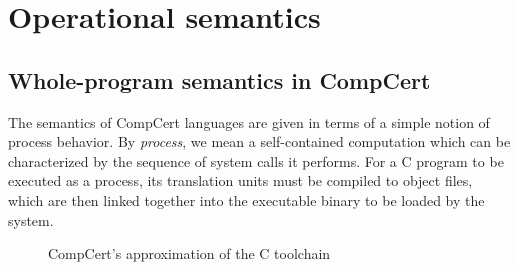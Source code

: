 \documentclass[acmsmall,authordraft]{acmart}
\begin{document}


\section{Operational semantics} \label{sec:sem} %


\subsection{Whole-program semantics in CompCert} \label{sec:sem:closed} %

The semantics of CompCert languages
are given in terms of a simple notion of process behavior.
By \emph{process}, we mean a self-contained computation
which can be characterized by
the sequence of system calls it performs.
For a C program to be executed as a process,
its translation units must be compiled to object files,
which are then linked together
into the executable binary
to be loaded by the system.

\begin{figure} %
    \caption{CompCert's approximation of the C toolchain}
    \label{fig:process}
\end{figure}
\end{document}
